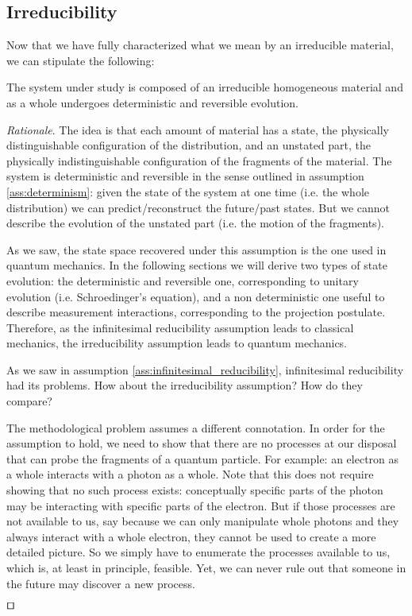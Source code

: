 \documentclass[smallextended]{svjour3}
\numberwithin{equation}{section}
\newenvironment{rationale}{\emph{Rationale}.}{\hfill\(\qed\)}
\begin{document}
\subsection{Irreducibility}

Now that we have fully characterized what we mean by an irreducible material, we can stipulate the following:

\begin{assump}[Irreducibility]\label{ass:irreducibility}
	The system under study is composed of an irreducible homogeneous material and as a whole undergoes deterministic and reversible evolution.
\end{assump}

\begin{rationale}
	The idea is that each amount of material has a state, the physically distinguishable configuration of the distribution, and an unstated part, the physically indistinguishable configuration of the fragments of the material. The system is deterministic and reversible in the sense outlined in assumption \ref{ass:determinism}: given the state of the system at one time (i.e. the whole distribution) we can predict/reconstruct the future/past states. But we cannot describe the evolution of the unstated part (i.e. the motion of the fragments).
	
	As we saw, the state space recovered under this assumption is the one used in quantum mechanics. In the following sections we will derive two types of state evolution: the deterministic and reversible one, corresponding to unitary evolution (i.e.  Schroedinger's equation), and a non deterministic one useful to describe measurement interactions, corresponding to the projection postulate. Therefore, as the infinitesimal reducibility assumption leads to classical mechanics, the irreducibility assumption leads to quantum mechanics.
	
	As we saw in assumption \ref{ass:infinitesimal_reducibility}, infinitesimal reducibility had its problems. How about the irreducibility assumption? How do they compare?
	
	The methodological problem assumes a different connotation. In order for the assumption to hold, we need to show that there are no processes at our disposal that can probe the fragments of a quantum particle. For example: an electron as a whole interacts with a photon as a whole. Note that this does not require showing that no such process exists: conceptually specific parts of the photon may be interacting with specific parts of the electron. But if those processes are not available to us, say because we can only manipulate whole photons and they always interact with a whole electron, they cannot be used to create a more detailed picture. So we simply have to enumerate the processes available to us, which is, at least in principle, feasible. Yet, we can never rule out that someone in the future may discover a new process.


\end{rationale}
\end{document}
